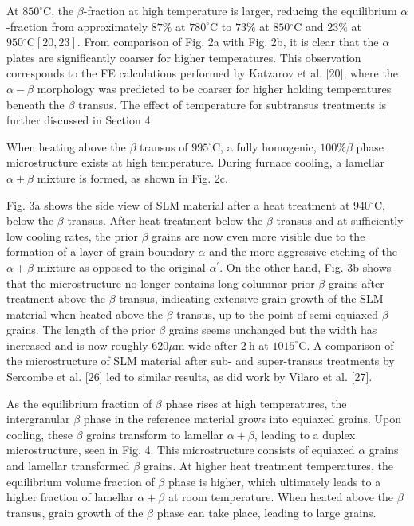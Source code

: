 \documentclass[10pt]{article}
\begin{document}
At $850^{\circ} \mathrm{C}$, the $\beta$-fraction at high temperature is larger, reducing the equilibrium $\alpha$-fraction from approximately $87 \%$ at $780^{\circ} \mathrm{C}$ to $73 \%$ at $850{ }^{\circ} \mathrm{C}$ and $23 \%$ at $950{ }^{\circ} \mathrm{C}[20,23]$. From comparison of Fig. 2a with Fig. 2b, it is clear that the $\alpha$ plates are significantly coarser for higher temperatures. This observation corresponds to the FE calculations performed by Katzarov et al. [20], where the $\alpha-\beta$ morphology was predicted to be coarser for higher holding temperatures beneath the $\beta$ transus. The effect of temperature for subtransus treatments is further discussed in Section 4.

When heating above the $\beta$ transus of $995^{\circ} \mathrm{C}$, a fully homogenic, $100 \% \beta$ phase microstructure exists at high temperature. During furnace cooling, a lamellar $\alpha+\beta$ mixture is formed, as shown in Fig. 2c.

Fig. 3a shows the side view of SLM material after a heat treatment at $940{ }^{\circ} \mathrm{C}$, below the $\beta$ transus. After heat treatment below the $\beta$ transus and at sufficiently low cooling rates, the prior $\beta$ grains are now even more visible due to the formation of a layer of grain boundary $\alpha$ and the more aggressive etching of the $\alpha+\beta$ mixture as opposed to the original $\alpha^{\prime}$. On the other hand, Fig. 3b shows that the microstructure no longer contains long columnar prior $\beta$ grains after treatment above the $\beta$ transus, indicating extensive grain growth of the SLM material when heated above the $\beta$ transus, up to the point of semi-equiaxed $\beta$ grains. The length of the prior $\beta$ grains seems unchanged but the width has increased and is now roughly $620 \mu \mathrm{m}$ wide after $2 \mathrm{~h}$ at $1015^{\circ} \mathrm{C}$. A comparison of the microstructure of SLM material after sub- and super-transus treatments by Sercombe et al. [26] led to similar results, as did work by Vilaro et al. [27].

As the equilibrium fraction of $\beta$ phase rises at high temperatures, the intergranular $\beta$ phase in the reference material grows into equiaxed grains. Upon cooling, these $\beta$ grains transform to lamellar $\alpha+\beta$, leading to a duplex microstructure, seen in Fig. 4. This microstructure consists of equiaxed $\alpha$ grains and lamellar transformed $\beta$ grains. At higher heat treatment temperatures, the equilibrium volume fraction of $\beta$ phase is higher, which ultimately leads to a higher fraction of lamellar $\alpha+\beta$ at room temperature. When heated above the $\beta$ transus, grain growth of the $\beta$ phase can take place, leading to large grains.
\end{document}
